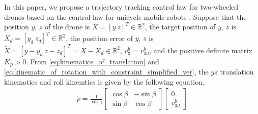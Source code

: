 In this paper, we propose a trajectory tracking control law for two-wheeled drones based on the control law for unicycle mobile robots \cite{rodriguez-cortesNewGeometricTrajectory2022}.
Suppose that the position $ y $, $ z $ of the drone is $ X = [y ~ z]^T \in \mathbb{R}^2 $, the target position of $ y $, $ z $ is $ X_d = [y_d ~ z_d]^T \in \mathbb{R}^2 $, the position error of $ y $, $ z $ is $ \tilde{X} = [y - y_d ~ z - z_d ]^T = X - X_d \in \mathbb{R}^2 $, $ v_3^b = v_{3d}^b $, and the positive definite matrix $ K_p > 0 $.
From \eqref{eq:kinematics_of_translation} and \eqref{eq:kinematic_of_rotation_with_constraint_simplified_ver}, the $ yz $ translation kinematics and roll kinemtics is given by the following equation, 
\begin{align}
    \label{eq:translation_kinematics_of_yz_without_second_term}
    \dot{p} = \frac{1}{\cos \gamma}
    \begin{bmatrix}
        \cos \beta & - \sin \beta \\
        \sin \beta & \cos \beta
    \end{bmatrix}
    \begin{bmatrix}
        0 \\
        v_{3d}^b
    \end{bmatrix}
\end{align}

